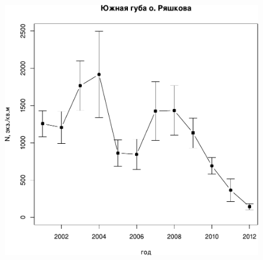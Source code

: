 \begin{figure}[p]
\begin{minipage}[b]{.49\linewidth}
\begin{center}
	\end{center}
	\end{minipage}


	\begin{minipage}[b]{.49\linewidth}
	\begin{center}
		\includegraphics[width=\linewidth]{../White_Sea/Ryashkov_YuG/N_dynamic1.pdf}
	\end{center}
	\end{minipage}
%
	\hfil %
%
	\begin{minipage}[b]{.49\linewidth}
	\begin{center}

\end{center}
\end{minipage}
\end{figure}
